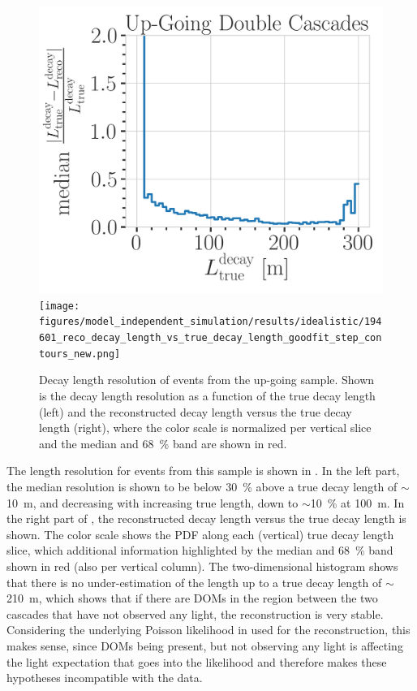 \begin{figure}[h]
	\centering
    \includegraphics[width=0.47\linewidth]{figures/model_independent_simulation/results/idealistic/194601_median_decay_length_resolution_goodfit_log_unweighted.png}
    \texttt{[image: figures/model\_independent\_simulation/results/idealistic/194601\_reco\_decay\_length\_vs\_true\_decay\_length\_goodfit\_step\_contours\_new.png]}
    \caption[Up-going double-cascade decay length resolution]{Decay length resolution of events from the up-going sample. Shown is the decay length resolution as a function of the true decay length (left) and the reconstructed decay length versus the true decay length (right), where the color scale is normalized per vertical slice and the median and \SI{68}{\percent} band are shown in red.}
\end{figure}

The length resolution for events from this sample is shown in . In the left part, the median resolution is shown to be below \SI{30}{\percent} above a true decay length of $\sim$\SI{10}{\meter}, and decreasing with increasing true length, down to $\sim$\SI{10}{\percent} at \SI{100}{\meter}. In the right part of , the reconstructed decay length versus the true decay length is shown. The color scale shows the PDF along each (vertical) true decay length slice, which additional information highlighted by the median and \SI{68}{\percent} band shown in red (also per vertical column). The two-dimensional histogram shows that there is no under-estimation of the length up to a true decay length of $\sim$\SI{210}{\meter}, which shows that if there are DOMs in the region between the two cascades that have not observed any light, the reconstruction is very stable. Considering the underlying Poisson likelihood in  used for the reconstruction, this makes sense, since DOMs being present, but not observing any light is affecting the light expectation that goes into the likelihood and therefore makes these hypotheses incompatible with the data.


